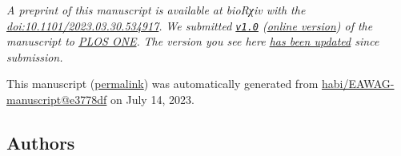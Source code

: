 \emph{A preprint of this manuscript is available at bioRχiv with the \href{https://doi.org/10.1101/2023.03.30.534917}{doi:10.1101/2023.03.30.534917}.}
\emph{We submitted \href{https://github.com/habi/EAWAG-manuscript/releases/tag/v1.0}{\texttt{v1.0}} (\href{https://habi.github.io/EAWAG-manuscript/v/e1e2ef76a476174a4115937d77457037ddec95df/}{online version}) of the manuscript to \href{https://journals.plos.org/plosone/}{PLOS ONE}.}
\emph{The version you see here \href{https://github.com/habi/EAWAG-manuscript/compare/v1.0...e3778df7e37340d9ba95d4eabfe433cd259fef1f}{has been updated} since submission.}

This manuscript
(\href{https://habi.github.io/EAWAG-manuscript/v/e3778df7e37340d9ba95d4eabfe433cd259fef1f/}{permalink})
was automatically generated
from \href{https://github.com/habi/EAWAG-manuscript/tree/e3778df7e37340d9ba95d4eabfe433cd259fef1f}{habi/EAWAG-manuscript@e3778df}
on July 14, 2023.

\hypertarget{authors}{%
\subsection{Authors}\label{authors}}

